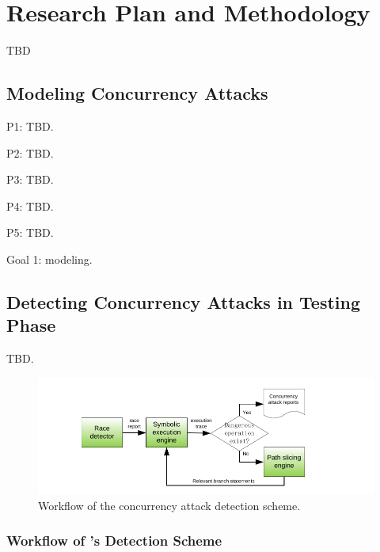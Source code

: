 \section{Research Plan and Methodology} \label{sec:rep}

TBD

\subsection{Modeling Concurrency Attacks} \label{sec:model}

P1: TBD.

P2: TBD.

P3: TBD.

P4: TBD.

P5: TBD.


Goal 1: modeling.

\subsection{Detecting Concurrency Attacks in Testing Phase}\label{sec:detect}

TBD.

\begin{figure}[t]
\centering
\includegraphics[width=0.5\columnwidth]{figures/detection}
\vspace{-.05in}
\caption{{Workflow of the concurrency attack detection scheme.}} 
\label{fig:detection}
\vspace{-.05in}
\end{figure}

\subsubsection{Workflow of \xxx's Detection Scheme}\label{sec:detect-arch}

